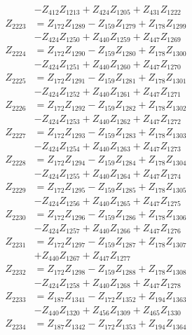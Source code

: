 \begin{multicols}{2}
\begin{align}
&- Z_{412}Z_{1213} + Z_{424}Z_{1205} + Z_{431}Z_{1222} \nonumber \\
Z_{2223} &= Z_{172}Z_{1289} - Z_{159}Z_{1279} + Z_{178}Z_{1299}  \nonumber \\
&- Z_{424}Z_{1250} + Z_{440}Z_{1259} + Z_{447}Z_{1269} \nonumber \\
Z_{2224} &= Z_{172}Z_{1290} - Z_{159}Z_{1280} + Z_{178}Z_{1300}  \nonumber \\
&- Z_{424}Z_{1251} + Z_{440}Z_{1260} + Z_{447}Z_{1270} \nonumber \\
Z_{2225} &= Z_{172}Z_{1291} - Z_{159}Z_{1281} + Z_{178}Z_{1301}  \nonumber \\
&- Z_{424}Z_{1252} + Z_{440}Z_{1261} + Z_{447}Z_{1271} \nonumber \\
Z_{2226} &= Z_{172}Z_{1292} - Z_{159}Z_{1282} + Z_{178}Z_{1302}  \nonumber \\
&- Z_{424}Z_{1253} + Z_{440}Z_{1262} + Z_{447}Z_{1272} \nonumber \\
Z_{2227} &= Z_{172}Z_{1293} - Z_{159}Z_{1283} + Z_{178}Z_{1303}  \nonumber \\
&- Z_{424}Z_{1254} + Z_{440}Z_{1263} + Z_{447}Z_{1273} \nonumber \\
Z_{2228} &= Z_{172}Z_{1294} - Z_{159}Z_{1284} + Z_{178}Z_{1304}  \nonumber \\
&- Z_{424}Z_{1255} + Z_{440}Z_{1264} + Z_{447}Z_{1274} \nonumber \\
Z_{2229} &= Z_{172}Z_{1295} - Z_{159}Z_{1285} + Z_{178}Z_{1305}  \nonumber \\
&- Z_{424}Z_{1256} + Z_{440}Z_{1265} + Z_{447}Z_{1275} \nonumber \\
Z_{2230} &= Z_{172}Z_{1296} - Z_{159}Z_{1286} + Z_{178}Z_{1306}  \nonumber \\
&- Z_{424}Z_{1257} + Z_{440}Z_{1266} + Z_{447}Z_{1276} \nonumber \\
Z_{2231} &= Z_{172}Z_{1297} - Z_{159}Z_{1287} + Z_{178}Z_{1307}  \nonumber \\
&+ Z_{440}Z_{1267} + Z_{447}Z_{1277} \nonumber \\
Z_{2232} &= Z_{172}Z_{1298} - Z_{159}Z_{1288} + Z_{178}Z_{1308}  \nonumber \\
&- Z_{424}Z_{1258} + Z_{440}Z_{1268} + Z_{447}Z_{1278} \nonumber \\
Z_{2233} &= Z_{187}Z_{1341} - Z_{172}Z_{1352} + Z_{194}Z_{1363}  \nonumber \\
&- Z_{440}Z_{1320} + Z_{456}Z_{1309} + Z_{465}Z_{1330} \nonumber \\
Z_{2234} &= Z_{187}Z_{1342} - Z_{172}Z_{1353} + Z_{194}Z_{1364}  \nonumber \\

\end{align}
\end{multicols}
